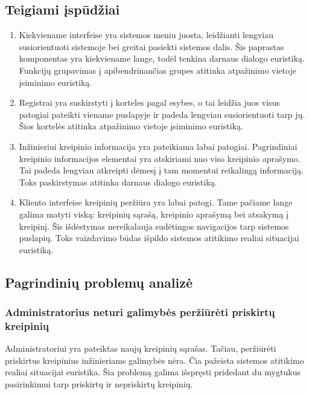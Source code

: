 \subsection{Teigiami įspūdžiai}
	\begin{enumerate}
	\item Kiekviename interfeise yra sistemos meniu juosta, leidžianti lengviau susiorientuoti sistemoje bei greitai pasiekti sistemos dalis.
	Šis paprastas komponentas yra kiekviename lange, todėl tenkina darnaus dialogo euristiką.
	Funkcijų grupavimas į apibendrinančias grupes atitinka atpažinimo vietoje įsiminimo euristiką.
	\item Registrai yra suskirstyti į korteles pagal esybes, o tai leidžia juos visus patogiai pateikti viename puslapyje ir padeda lengviau susiorientuoti tarp jų.
	Šios kortelės atitinka atpažinimo vietoje įsiminimo euristiką.
	\item Inžinieriui kreipinio informacija yra pateikiama labai patogiai. Pagrindiniai kreipinio informacijos elementai yra atskiriami nuo viso kreipinio aprašymo.
	Tai padeda lengviau atkreipti dėmesį į tam momentui reikalingą informaciją.
	Toks paskirstymas atitinka darnaus dialogo euristiką.
	\item Kliento interfeise kreipinių peržiūra yra labai patogi.
	Tame pačiame lange galima matyti viską: kreipinių sąrašą, kreipinio aprašymą bei atsakymą į kreipinį.
	Šis išdėstymas nereikalauja sudėtingos navigacijos tarp sistemos puslapių.
	Toks vaizdavimo būdas išpildo sistemos atitikimo realiai situacijai euristiką.
	\end{enumerate}
	
\subsection{Pagrindinių problemų analizė}
	
	\subsubsection{Administratorius neturi galimybės peržiūrėti priskirtų kreipinių}
		
		Administratoriui yra pateiktas naujų kreipinių sąrašas.
		Tačiau, peržiūrėti priskirtus kreipinius inžinieriams galimybės nėra.
		Čia pažeista sistemos atitikimo realiai situacijai euristika.
		Šia problemą galima išspręsti pridedant du mygtukus pasirinkimui tarp priskirtų ir nepriskirtų kreipinių.
		
